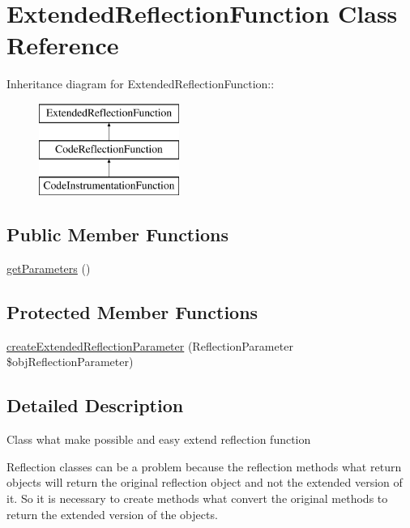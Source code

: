 \hypertarget{class_extended_reflection_function}{
\section{ExtendedReflectionFunction Class Reference}
\label{class_extended_reflection_function}
}
Inheritance diagram for ExtendedReflectionFunction::\begin{figure}[H]
\begin{center}
\leavevmode
\includegraphics[height=3cm]{class_extended_reflection_function}
\end{center}
\end{figure}
\subsection*{Public Member Functions}
\begin{CompactItemize}
\item 
\hyperlink{class_extended_reflection_function_015cb52e5774a1972d296c9694d2a3c3}{getParameters} ()
\end{CompactItemize}
\subsection*{Protected Member Functions}
\begin{CompactItemize}
\item 
\hyperlink{class_extended_reflection_function_98ceb248f2b535a3a83ac2e7990e0c1f}{createExtendedReflectionParameter} (ReflectionParameter \$objReflectionParameter)
\end{CompactItemize}


\subsection{Detailed Description}
Class what make possible and easy extend reflection function

Reflection classes can be a problem because the reflection methods what return objects will return the original reflection object and not the extended version of it. So it is necessary to create methods what convert the original methods to return the extended version of the objects.

